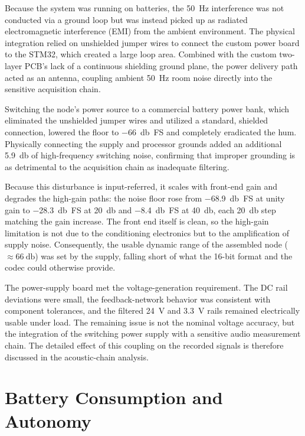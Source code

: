 Because the system was running on batteries, the \SI{50}{\hertz} interference was not conducted via a ground loop but was instead picked up as radiated electromagnetic interference (EMI) from the ambient environment. The physical integration relied on unshielded jumper wires to connect the custom power board to the STM32, which created a large loop area. Combined with the custom two-layer PCB's lack of a continuous shielding ground plane, the power delivery path acted as an antenna, coupling ambient \SI{50}{\hertz} room noise directly into the sensitive acquisition chain.

Switching the node's power source to a commercial battery power bank, which eliminated the unshielded jumper wires and utilized a standard, shielded connection, lowered the floor to \SI{-66}{\decibel FS} and completely eradicated the hum. Physically connecting the supply and processor grounds added an additional \SI{5.9}{\decibel} of high-frequency switching noise, confirming that improper grounding is as detrimental to the acquisition chain as inadequate filtering.

Because this disturbance is input-referred, it scales with front-end gain and degrades the high-gain paths: the noise floor rose from \SI{-68.9}{\decibel FS} at unity gain to \SI{-28.3}{\decibel FS} at \SI{+20}{\decibel} and \SI{-8.4}{\decibel FS} at \SI{+40}{\decibel}, each \SI{20}{\decibel} step matching the gain increase. The front end itself is clean, so the high-gain limitation is not due to the conditioning electronics but to the amplification of supply noise. Consequently, the usable dynamic range of the assembled node ($\approx\SI{66}{\decibel}$) was set by the supply, falling short of what the \mbox{16-bit} format and the codec could otherwise provide.

The power-supply board met the voltage-generation requirement. The DC rail deviations were small, the feedback-network behavior was consistent with component tolerances, and the filtered 24~V and 3.3~V rails remained electrically usable under load. The remaining issue is not the nominal voltage accuracy, but the integration of the switching power supply with a sensitive audio measurement chain. The detailed effect of this coupling on the recorded signals is therefore discussed in the acoustic-chain analysis.

\section{Battery Consumption and Autonomy}

